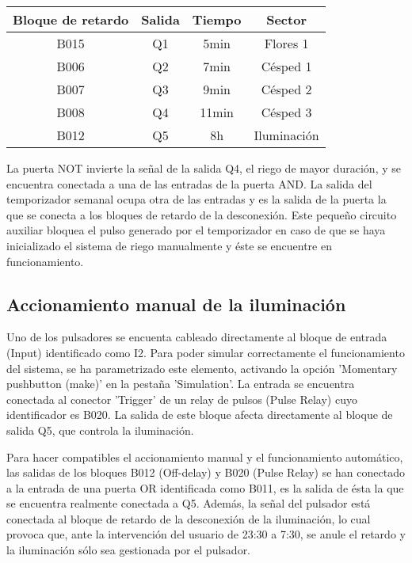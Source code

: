\begin{center}
\begin{tabular}{c|c|c|c}
 Bloque de retardo&Salida&Tiempo&Sector\\
 \hline
 B015&Q1&5min&Flores 1 \\
 B006&Q2&7min&Césped 1 \\
 B007&Q3&9min&Césped 2 \\
 B008&Q4&11min&Césped 3 \\
 B012&Q5&8h&Iluminaci\'on \\
\end{tabular}
\end{center}

La puerta NOT invierte la señal de la salida Q4, el riego de mayor duraci\'on, y se encuentra conectada a una de las entradas de la puerta AND. La salida del temporizador semanal ocupa otra de las entradas y es la salida de la puerta la que se conecta a los bloques de retardo de la desconexi\'on. Este pequeño circuito auxiliar bloquea el pulso generado por el temporizador en caso de que se haya inicializado el sistema de riego manualmente y \'este se encuentre en funcionamiento.

\subsection{Accionamiento manual de la iluminaci\'on}

Uno de los pulsadores se encuenta cableado directamente al bloque de entrada (Input) identificado como I2. Para poder simular correctamente el funcionamiento del sistema, se ha parametrizado este elemento, activando la opci\'on 'Momentary pushbutton (make)' en la pestaña 'Simulation'. La entrada se encuentra conectada al conector 'Trigger' de un relay de pulsos (Pulse Relay) cuyo identificador es B020. La salida de este bloque afecta directamente al bloque de salida Q5, que controla la iluminaci\'on.

Para hacer compatibles el accionamiento manual y el funcionamiento autom\'atico, las salidas de los bloques B012 (Off-delay) y B020 (Pulse Relay) se han conectado a la entrada de una puerta OR identificada como B011, es la salida de \'esta la que se encuentra realmente conectada a Q5. Adem\'as, la señal del pulsador est\'a conectada al bloque de retardo de la desconexi\'on de la iluminaci\'on, lo cual provoca que, ante la intervenci\'on del usuario de 23:30 a 7:30, se anule el retardo y la iluminaci\'on s\'olo sea gestionada por el pulsador.

